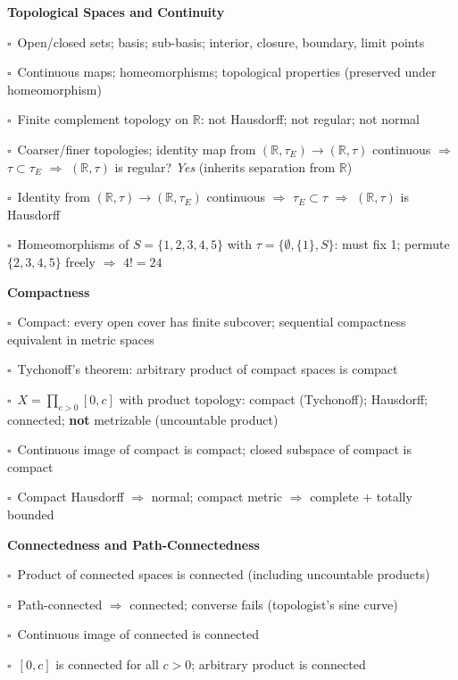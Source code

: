 \documentclass[11pt,a4paper]{article}
\newcommand{\chk}{\textcolor{rulegray}{$\square$}\ }
\begin{document}
\begin{subtopics}

  \item \textbf{Topological Spaces and Continuity}
  \begin{subtopics}
    \item \chk Open/closed sets; basis; sub-basis; interior, closure, boundary, limit points
    \item \chk Continuous maps; homeomorphisms; topological properties (preserved under homeomorphism)
    \item \chk Finite complement topology on $\mathbb{R}$: not Hausdorff; not regular; not normal
    \item \chk Coarser/finer topologies; identity map from $(\mathbb{R},\tau_E)\to(\mathbb{R},\tau)$ continuous $\Rightarrow$ $\tau\subset\tau_E$ $\Rightarrow$ $(\mathbb{R},\tau)$ is regular? \textit{Yes} (inherits separation from $\mathbb{R}$)
    \item \chk Identity from $(\mathbb{R},\tau)\to(\mathbb{R},\tau_E)$ continuous $\Rightarrow$ $\tau_E\subset\tau$ $\Rightarrow$ $(\mathbb{R},\tau)$ is Hausdorff
    \item \chk Homeomorphisms of $S=\{1,2,3,4,5\}$ with $\tau=\{\emptyset,\{1\},S\}$: must fix 1; permute $\{2,3,4,5\}$ freely $\Rightarrow$ $4!=24$
  \end{subtopics}

  \item \textbf{Compactness}
  \begin{subtopics}
    \item \chk Compact: every open cover has finite subcover; sequential compactness equivalent in metric spaces
    \item \chk Tychonoff's theorem: arbitrary product of compact spaces is compact
    \item \chk $X=\prod_{c>0}[0,c]$ with product topology: compact (Tychonoff); Hausdorff; connected; \textbf{not} metrizable (uncountable product)
    \item \chk Continuous image of compact is compact; closed subspace of compact is compact
    \item \chk Compact Hausdorff $\Rightarrow$ normal; compact metric $\Rightarrow$ complete + totally bounded
  \end{subtopics}

  \item \textbf{Connectedness and Path-Connectedness}
  \begin{subtopics}
    \item \chk Product of connected spaces is connected (including uncountable products)
    \item \chk Path-connected $\Rightarrow$ connected; converse fails (topologist's sine curve)
    \item \chk Continuous image of connected is connected
    \item \chk $[0,c]$ is connected for all $c>0$; arbitrary product is connected
  \end{subtopics}


\end{subtopics}
\end{document}
